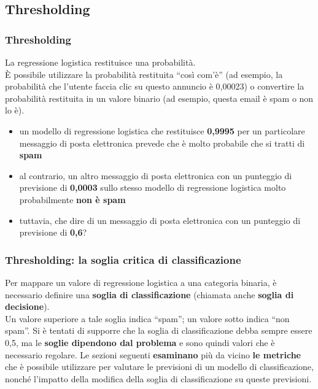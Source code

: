 \subsection[Thresholding]{Thresholding}



\begin{frame}
	
	\frametitle{Thresholding}
	
	La regressione logistica restituisce una probabilità.\\
	È possibile utilizzare la probabilità restituita ``così com'è'' (ad esempio, la probabilità che l'utente faccia clic su questo annuncio è 0,00023) o convertire la probabilità restituita in un valore binario (ad esempio, questa email è spam o non lo è).
	\begin{itemize}
		\item un modello di regressione logistica che restituisce \textbf{0,9995} per un particolare messaggio di posta elettronica prevede che è molto probabile che si tratti di \textbf{spam}
		\item al contrario, un altro messaggio di posta elettronica con un punteggio di previsione di \textbf{0,0003} sullo stesso modello di regressione logistica molto probabilmente \textbf{non è spam}
		\item tuttavia, che dire di un messaggio di posta elettronica con un punteggio di previsione di \textbf{0,6}?
	\end{itemize}
	
\end{frame}


\begin{frame}
	
	\frametitle{Thresholding: la soglia critica di classificazione}
	Per mappare un valore di regressione logistica a una categoria binaria, è necessario definire una \textbf{soglia di classificazione} (chiamata anche \textbf{soglia di decisione}).\\
	Un valore superiore a tale soglia indica ``spam''; un valore sotto indica ``non spam''.
	\newlinedouble
	Si è tentati di supporre che la soglia di classificazione debba sempre essere 0,5, ma le \textbf{soglie dipendono dal problema} e sono quindi valori che è necessario regolare.
	\newlinedouble
	Le sezioni seguenti \textbf{esaminano} più da vicino \textbf{le metriche} che è possibile utilizzare per valutare le previsioni di un modello di classificazione, nonché l'impatto della modifica della soglia di classificazione su queste previsioni.
	
\end{frame}


